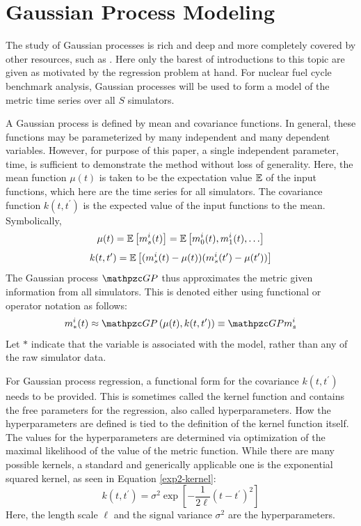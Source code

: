\section{Gaussian Process Modeling}
\label{gp}
The study of Gaussian processes is rich and deep and more completely covered by 
other resources, such as \cite{rasmussen2006gaussian}. Here only the barest of 
introductions to this topic are given as motivated by the regression problem at
hand. For nuclear fuel cycle benchmark analysis, Gaussian processes will be used
to form a model of the metric time series over all $S$ simulators. 

A Gaussian process is defined by mean and covariance functions. 
In general, these functions may be parameterized by many independent and 
many dependent variables.  However, for purpose of this paper, a single 
independent parameter, time, is sufficient to demonstrate the method without 
loss of generality.  
Here, the mean function $\mu(t)$ is taken to be the expectation value $\mathbb{E}$ of 
the input functions, which here are the time series for all simulators. The
covariance function $k(t, t^\prime)$ is the expected value of the input 
functions to the mean. Symbolically, 
\begin{equation}
\label{mean-func}
\mu(t) = \mathbb{E}\left[m_s^i(t)\right] = \mathbb{E}\left[m_0^i(t), m_1^i(t), \ldots\right]
\end{equation}
\begin{equation}
\label{covar-func}
k(t, t^\prime) = \mathbb{E}\left[(m_s^i(t) - \mu(t))(m_s^i(t^\prime) - \mu(t^\prime))\right]
\end{equation}
The Gaussian process $\GP$ thus approximates the metric given information 
from all simulators. This is denoted either using functional or operator notation as follows:
\begin{equation}
\label{gp-def-approx}
m_*^i(t) \approx \GP\left(\mu(t), k(t, t^\prime)\right) \equiv \GP m_s^i
\end{equation}
Let $*$ indicate that the variable is associated with  
the model, rather than any of the raw simulator data.


For Gaussian process regression, a functional form for the covariance 
$k(t, t^\prime)$ needs to be provided.
This is sometimes called the kernel function and contains the free parameters 
for the regression, also called hyperparameters. How the hyperparameters are 
defined is 
tied to the definition of the kernel function itself. The values for the 
hyperparameters are determined
via optimization of the maximal likelihood of the value of the metric function.
While there are many possible kernels, a standard and generically applicable one 
is the exponential squared kernel, as seen in Equation \ref{exp2-kernel}:
\begin{equation}
\label{exp2-kernel}
k(t, t^\prime) = \sigma^2 \exp\left[-\frac{1}{2\ell}(t - t^\prime)^2 \right]
\end{equation}
Here, the length scale $\ell$ and the signal variance $\sigma^2$ are the 
hyperparameters.

